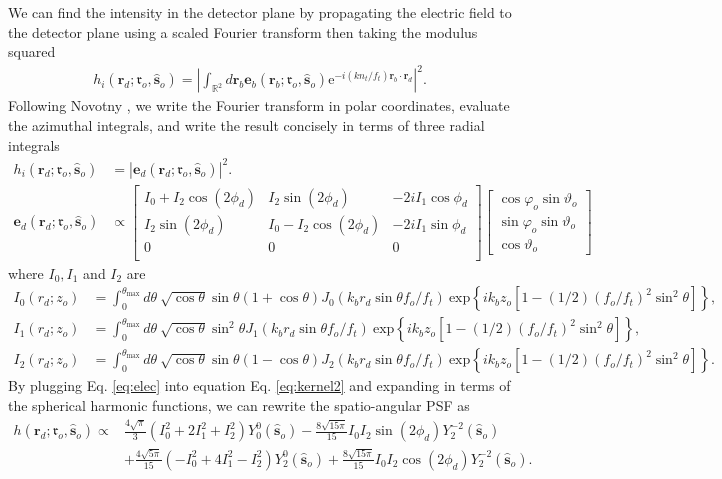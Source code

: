\documentclass[11pt]{article}
\newcommand{\me}{\mathrm{e}}
\providecommand{\mb}[1]{\mathbf{#1}}
\providecommand{\ro}[1]{\mathbf{\mathfrak{r}}_o}
\providecommand{\so}[1]{\mathbf{\hat{s}}_o}
\providecommand{\rb}[1]{\mathbf{r}_b}
\providecommand{\rd}[1]{\mathbf{r}_d}
\begin{document}
We can find the intensity in the detector plane by propagating the electric
field to the detector plane using a scaled Fourier transform then taking the
modulus squared
\begin{align}
  h_i(\rd{}; \ro{}, \so{}) = \left|\int_{\mathbb{R}^2} d\rb{} \mb{e}_b(\rb{}; \ro{}, \so{})\me^{-i (kn_t/f_t) \rb{} \cdot \rd{}}\right|^2 \label{eq:kernel}.
\end{align}
Following Novotny \cite{nov2006}, we write the Fourier transform in polar
coordinates, evaluate the azimuthal integrals, and write the result concisely in
terms of three radial integrals
\begin{align}
    h_i(\rd{}; \ro{}, \so{}) &= \left|\mb{e}_d(\rd{}; \ro{}, \so{})\right|^2 \label{eq:kernel2}.\\
  \mb{e}_d(\rd{}; \ro{}, \so{}) &\propto
  \begin{bmatrix}
    I_0 + I_2\cos(2\phi_d) & I_2\sin(2\phi_d) & -2iI_1\cos\phi_d\\
    I_2\sin(2\phi_d) & I_0 - I_2\cos(2\phi_d) & -2iI_1\sin\phi_d\\
    0&0&0\\
  \end{bmatrix}
  \begin{bmatrix}
    \cos\varphi_o\sin\vartheta_o\\
    \sin\varphi_o\sin\vartheta_o\\
    \cos\vartheta_o
  \end{bmatrix}\label{eq:elec}
\end{align}
where $I_0, I_1$ and $I_2$ are
\begin{align}
  I_0(r_d; z_o) &= \int_0^{\theta_{\text{max}}}d\theta\ \sqrt{\cos\theta}\sin\theta(1+\cos\theta)J_0(k_b r_d\sin\theta f_o/f_t)\ \text{exp}\left\{ik_bz_o[1-(1/2)(f_o/f_t)^2\sin^2\theta]\right\},\\
  I_1(r_d; z_o) &= \int_0^{\theta_{\text{max}}}d\theta\ \sqrt{\cos\theta}\sin^2\theta J_1(k_b r_d\sin\theta f_o/f_t)\ \text{exp}\left\{ik_bz_o[1-(1/2)(f_o/f_t)^2\sin^2\theta]\right\},\\
  I_2(r_d; z_o) &= \int_0^{\theta_{\text{max}}}d\theta\ \sqrt{\cos\theta}\sin\theta(1-\cos\theta)J_2(k_b r_d\sin\theta f_o/f_t)\ \text{exp}\left\{ik_bz_o[1-(1/2)(f_o/f_t)^2\sin^2\theta]\right\}.
\end{align}
By plugging Eq. \ref{eq:elec} into equation Eq. \ref{eq:kernel2} and expanding in
terms of the spherical harmonic functions, we can rewrite the spatio-angular
PSF as
\begin{equation}
  \begin{split}
  h(\rd{}; \ro{}, \so{}) \propto &\frac{4\sqrt{\pi}}{3}\left(I_0^2 + 2I_1^2 + I_2^2\right)Y_0^0(\so{}) -\frac{8\sqrt{15\pi}}{15}I_0I_2\sin(2\phi_d)Y_2^{-2}(\so{})\\ &+ \frac{4\sqrt{5\pi}}{15}\left(-I_0^2 + 4I_1^2 - I_2^2\right)Y_2^{0}(\so{}) +\frac{8\sqrt{15\pi}}{15}I_0I_2\cos(2\phi_d)Y_2^{-2}(\so{}). \label{eq:kerna}
\end{split}
\end{equation}
\end{document}
